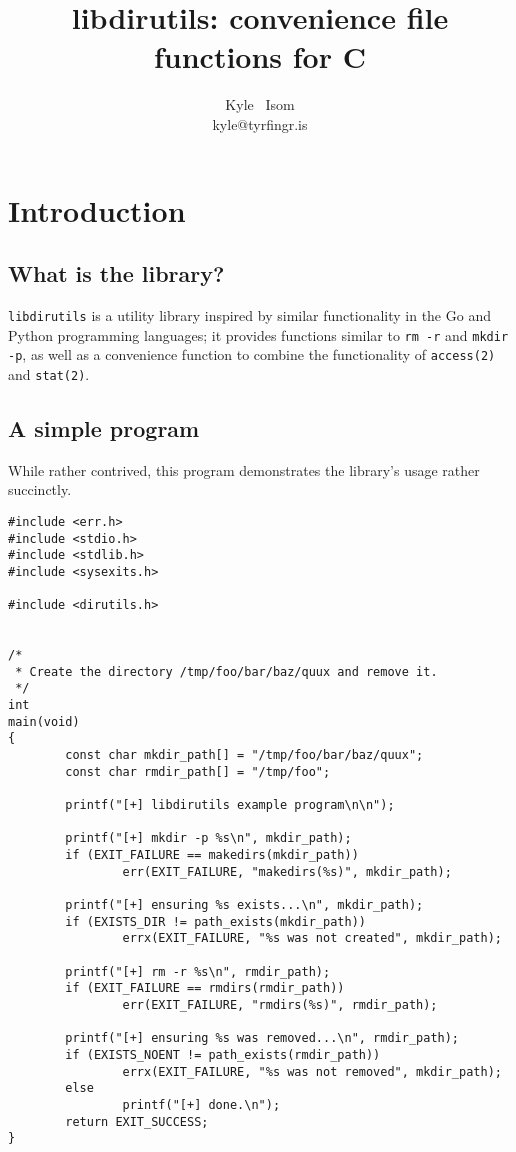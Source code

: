 \documentclass[10pt,letterpaper]{article}
\title{libdirutils: convenience file functions for C}\author{Kyle ~Isom\\kyle@tyrfingr.is}
\begin{document}
\maketitle
\section*{Introduction}
\subsection*{What is the library?}
\verb|libdirutils| is a utility library inspired by similar functionality
in the Go and Python programming languages; it provides functions similar
to \verb|rm -r| and \verb|mkdir -p|, as well as a convenience function to
combine the functionality of \verb|access(2)| and \verb|stat(2)|.

\subsection*{A simple program}
While rather contrived, this program demonstrates the library's usage rather
succinctly.

\begin{verbatim}
#include <err.h>
#include <stdio.h>
#include <stdlib.h>
#include <sysexits.h>

#include <dirutils.h>


/*
 * Create the directory /tmp/foo/bar/baz/quux and remove it.
 */
int
main(void)
{
        const char mkdir_path[] = "/tmp/foo/bar/baz/quux";
        const char rmdir_path[] = "/tmp/foo";

        printf("[+] libdirutils example program\n\n");

        printf("[+] mkdir -p %s\n", mkdir_path);
        if (EXIT_FAILURE == makedirs(mkdir_path))
                err(EXIT_FAILURE, "makedirs(%s)", mkdir_path);

        printf("[+] ensuring %s exists...\n", mkdir_path);
        if (EXISTS_DIR != path_exists(mkdir_path))
                errx(EXIT_FAILURE, "%s was not created", mkdir_path);

        printf("[+] rm -r %s\n", rmdir_path);
        if (EXIT_FAILURE == rmdirs(rmdir_path))
                err(EXIT_FAILURE, "rmdirs(%s)", rmdir_path);

        printf("[+] ensuring %s was removed...\n", rmdir_path);
        if (EXISTS_NOENT != path_exists(rmdir_path))
                errx(EXIT_FAILURE, "%s was not removed", mkdir_path);
        else
                printf("[+] done.\n");
        return EXIT_SUCCESS;
}
\end{verbatim}
\end{document}
